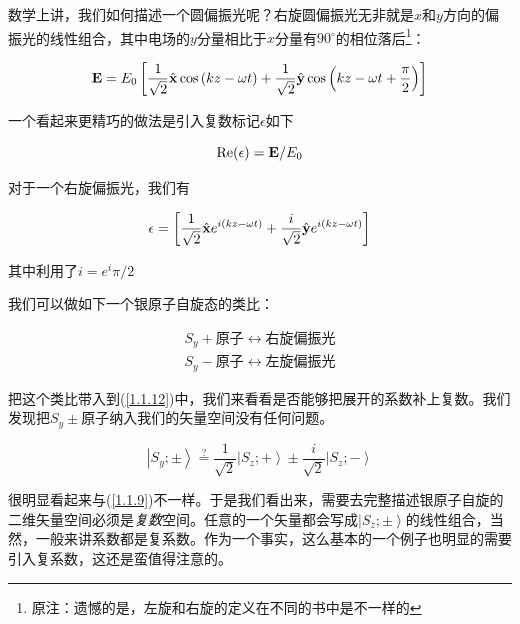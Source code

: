 \documentclass[UTF8,twoside]{ctexart}
\begin{document}
数学上讲，我们如何描述一个圆偏振光呢？右旋圆偏振光无非就是$x$和$y$方向的偏振光的线性组合，其中电场的$y$分量相比于$x$分量有$90^{\circ}$的相位落后\footnote{原注：遗憾的是，左旋和右旋的定义在不同的书中是不一样的}：

\begin{equation}
{\bf E} = E_0 \left[\frac{1}{\sqrt{2}} \hat{\bf x}\cos\left(kz - \omega t\right) + \frac{1}{\sqrt{2}} \hat{\bf y}\cos\left(kz - \omega t + \frac{\pi}{2}\right)  \right]
\end{equation}

\noindent 一个看起来更精巧的做法是引入复数标记$\epsilon$如下

\begin{equation}
\text{Re}(\epsilon) = {\bf E} / E_0
\end{equation}

\noindent 对于一个右旋偏振光，我们有

\begin{equation}  \label{1.1.12}
\epsilon = \left[\frac{1}{\sqrt{2}} \hat{\bf x}e^{i(kz - \omega t)} + \frac{i}{\sqrt{2}} \hat{\bf y}e^{i(kz - \omega t)}  \right]
\end{equation}

\noindent 其中利用了$i = e^i\pi / 2$

我们可以做如下一个银原子自旋态的类比：

\begin{equation}
\begin{split}
S_y + \text{原子} \leftrightarrow \text{右旋偏振光}\\
S_y - \text{原子} \leftrightarrow \text{左旋偏振光}
\end{split}
\end{equation}

\noindent 把这个类比带入到(\ref{1.1.12})中，我们来看看是否能够把展开的系数补上复数。我们发现把$S_y \pm$原子纳入我们的矢量空间没有任何问题。

\begin{equation}
\left|S_y ;\pm \right\rangle \overset{?}= \frac{1}{\sqrt{2}}\left|S_z ;+\right\rangle \pm \frac{i}{\sqrt{2}}\left|S_z ;-\right\rangle
\end{equation}

\noindent 很明显看起来与(\ref{1.1.9})不一样。于是我们看出来，需要去完整描述银原子自旋的二维矢量空间必须是\emph{复数}空间。任意的一个矢量都会写成$\left|S_z; \pm\right\rangle$的线性组合，当然，一般来讲系数都是复系数。作为一个事实，这么基本的一个例子也明显的需要引入复系数，这还是蛮值得注意的。
\end{document}

